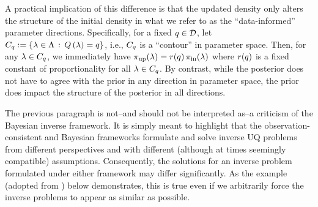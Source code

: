 A practical implication of this difference is that the updated density only alters the structure of the initial density in what we refer to as the ``data-informed'' parameter directions.
Specifically, for a fixed $q\in\mathcal{D}$, let $C_q := \left\{\lambda\in{\Lambda}\, : \, Q\left ( \lambda \right )=q\right\}$, i.e., $C_q$ is a ``contour'' in parameter space.
Then, for any $\lambda\in C_q$, we immediately have $\operatorname*{\pi_{up}}(\lambda)=r(q)\operatorname*{\pi_{in}}(\lambda)$ where $r(q)$ is a fixed constant of proportionality for all $\lambda\in C_q$.
By contrast, while the posterior does not have to agree with the prior in any direction in parameter space, the prior does impact the structure of the posterior in all directions.

The previous paragraph is not\---and should not be interpreted as\---a criticism of the Bayesian inverse framework.
It is simply meant to highlight that the observation-consistent and Bayesian frameworks formulate and solve inverse UQ problems from different perspectives and with different (although at times seemingly compatible) assumptions.
Consequently, the solutions for an inverse problem formulated under either framework may differ significantly.
As the example (adopted from \cite{BJW18a, BJW18b}) below demonstrates, this is true even if we arbitrarily force the inverse problems to appear as similar as possible.

\FloatBarrier
